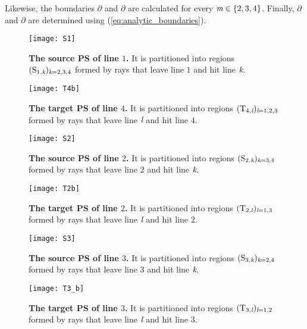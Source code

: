  Likewise, the boundaries $\partial$ and
 $\partial$ are calculated for every $\textit{m}\in\{2,3,4\}$. Finally, $\partial$ and $\partial$ are determined using (\ref{eq:analytic_boundaries}). \\
 \begin{figure}
 \begin{minipage}[]{.43\textwidth}
   \texttt{[image: S1]}
\caption{\footnotesize{\textbf{The source PS of line $1$.} It is partitioned into regions $(\mbox{$\textup{S}_{\textit{$1$,\textit{k}}}$})_{\textit{\textit{k}} = 2,3,4}$
   formed by rays that leave line $1$ and hit line $\textit{\textit{k}}$.}}
   \label{fig:S1}
 \end{minipage}
  \begin{minipage}[]{.45\textwidth}
  \centering
   \texttt{[image: T4b]}
   \caption{\footnotesize{\textbf{The target PS of line $4$.} It is partitioned into regions $(\mbox{$\textup{T}_{\textit{$4$,\textit{l}}}$})_{\textit{\textit{l}} = 1,2,3}$
   formed by rays that leave line $\textit{\textit{l}}$ and hit line $4$.}}
   \label{fig:T4b}
 \end{minipage}
\begin{minipage}[]{.43\textwidth}
\centering
   \texttt{[image: S2]}
\caption{\footnotesize{\textbf{The source PS of line $2$.} It is partitioned into regions $(\mbox{$\textup{S}_{\textit{$2$,\textit{k}}}$})_{\textit{\textit{k}} = 3,4}$
  formed by rays that leave line $2$ and hit line $\textit{\textit{k}}$.}} 
 \end{minipage}
 \begin{minipage}[]{.43\textwidth}
 \centering
   \texttt{[image: T2b]}
\caption{\footnotesize{\textbf{The target PS of line $2$.} It is partitioned into regions $(\mbox{$\textup{T}_{\textit{$2$,\textit{l}}}$})_{\textit{\textit{l}} = 1,3}$
formed by rays that leave line $\textit{\textit{l}}$ and hit line $2$. }} 
 \end{minipage}
 \begin{minipage}[]{.43\textwidth}
 \centering
   \texttt{[image: S3]}
   \caption{\footnotesize{\textbf{The source PS of line $3$.} It is partitioned into regions
   $(\mbox{$\textup{S}_{\textit{$3$,\textit{k}}}$})_{\textit{\textit{k}} = 2,4}$ formed by rays that leave line $3$ and hit line $\textit{\textit{k}}$. }} 
 \end{minipage}
 \hspace{1.7cm}
 \begin{minipage}[]{.43\textwidth}
 \centering
   \texttt{[image: T3\_b]}
  \caption{\footnotesize{\textbf{The target PS of line $3$.} It is partitioned into regions $(\mbox{$\textup{T}_{\textit{$3$,\textit{l}}}$})_{\textit{\textit{l}} = 1,2}$
   formed by rays that leave line $\textit{\textit{l}}$ and hit line $3$.}} 
\label{fig:T3}
 \end{minipage}
\end{figure}
